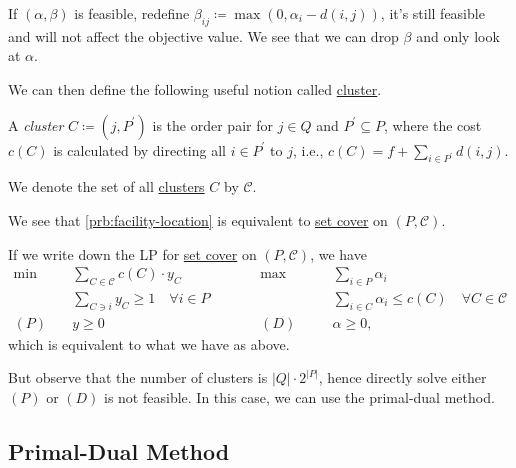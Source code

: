 \begin{remark}
	If \((\alpha , \beta )\) is feasible, redefine \(\beta _{ij} \coloneqq \max (0, \alpha _i - d(i, j))\), it's still feasible and will not affect the objective value. We see that we can drop \(\beta\) and only look at \(\alpha \).
\end{remark}

We can then define the following useful notion called \hyperref[def:cluster]{cluster}.

\begin{definition}[Cluster]\label{def:cluster}
	A \emph{cluster} \(C \coloneqq (j, P^\prime )\) is the order pair for \(j\in Q\) and \(P^\prime \subseteq P\), where the cost \(c(C)\) is calculated by directing all \(i\in P^\prime \) to \(j\), i.e., \(c(C) = f + \sum_{i\in P^\prime }d(i, j)\).
\end{definition}

\begin{notation}
	We denote the set of all \hyperref[def:cluster]{clusters} \(C\) by \(\mathcal{C} \).
\end{notation}

\begin{remark}
	We see that \autoref{prb:facility-location} is equivalent to \hyperref[prb:set-cover]{set cover} on \((P, \mathcal{C} )\).
\end{remark}
\begin{explanation}
	If we write down the LP for \hyperref[prb:set-cover]{set cover} on \((P, \mathcal{C} )\), we have
	\[
		\begin{alignedat}{5}
			\min~&\sum_{C\in \mathcal{C} } c(C)\cdot y_C\qquad\qquad&&\max ~&&\sum_{i\in P}\alpha _i\\
			& \sum_{C\ni i}y_C  \geq 1 \quad \forall i\in P 				&&		&&\sum_{i\in C} \alpha _{i} \leq c(C)\quad \forall C\in \mathcal{C}  \\
			(P)\quad	&y\geq  0 	&&(D)\quad&& \alpha \geq 0,
		\end{alignedat}
	\]
	which is equivalent to what we have as above.
\end{explanation}

But observe that the number of clusters is \(\left\vert Q \right\vert \cdot 2^{\left\vert P \right\vert }\), hence directly solve either \((P)\) or \((D)\) is not feasible. In this case, we can use the primal-dual method.

\subsection{Primal-Dual Method}

